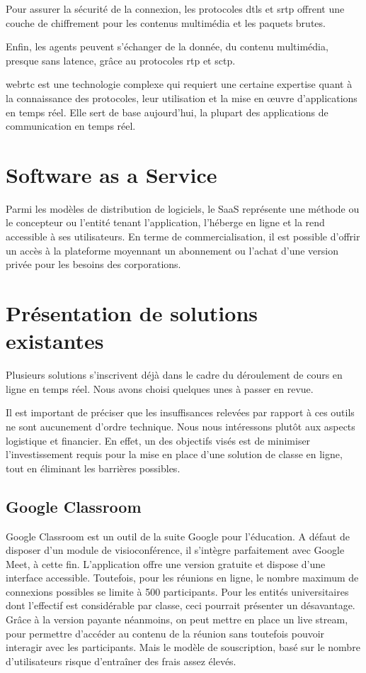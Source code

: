 Pour assurer la sécurité de la connexion, les protocoles \acrshort{dtls} et \acrshort{srtp} offrent une couche de chiffrement 
pour les contenus multimédia et les paquets brutes.

Enfin, les agents peuvent s'échanger de la donnée, du contenu multimédia, presque sans latence, grâce au protocoles \acrshort{rtp} et \acrshort{sctp}.

\acrshort{webrtc} est une technologie complexe qui requiert une certaine expertise quant à la connaissance des protocoles, 
leur utilisation et la mise en œuvre d'applications en temps réel. 
Elle sert de base aujourd’hui,  la plupart des applications de communication en temps réel.

\section{Software as a Service}
Parmi les modèles de distribution de logiciels, le SaaS représente une méthode ou le concepteur ou l'entité tenant l’application, 
l'héberge en ligne et la rend accessible à ses utilisateurs. 
En terme de commercialisation, il est possible d’offrir un accès à la plateforme moyennant un abonnement ou 
l’achat d’une version privée pour les besoins des corporations.

\section{Présentation de solutions existantes}
Plusieurs solutions s’inscrivent déjà dans le cadre du déroulement de cours en ligne en temps réel. 
Nous avons choisi quelques unes à passer en revue.

Il est important de préciser que les insuffisances relevées par rapport à ces outils ne sont aucunement d’ordre technique. 
Nous nous intéressons plutôt aux aspects logistique et financier. 
En effet, un des objectifs visés est de minimiser l’investissement requis pour la mise en place d’une solution de classe en ligne, 
tout en éliminant les barrières possibles.

\subsection{Google Classroom}
Google Classroom est un outil de la suite Google pour l'éducation. 
A défaut de disposer d’un module de visioconférence, il s'intègre parfaitement avec Google Meet, à cette fin. 
L’application offre une version gratuite et dispose d’une interface accessible. 
Toutefois, pour les réunions en ligne, le nombre maximum de connexions possibles se limite à 500 participants. 
Pour les entités universitaires dont l’effectif est considérable par classe, ceci pourrait présenter un désavantage. 
Grâce à la version payante néanmoins, on peut mettre en place un live stream, pour permettre d'accéder au contenu de 
la réunion sans toutefois pouvoir interagir avec les participants. 
Mais le modèle de souscription, basé sur le nombre d’utilisateurs risque d'entraîner des frais assez élevés.

